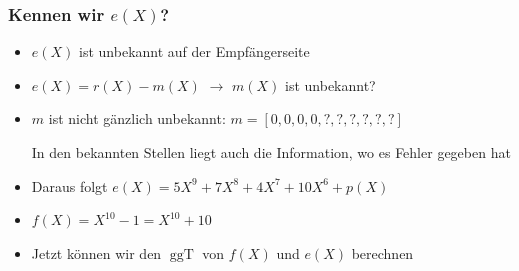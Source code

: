 \documentclass[11pt,aspectratio=169]{beamer}
\begin{document}
	\begin{frame}
		\frametitle{Kennen wir $e(X)$?}
		
		\begin{itemize}
			
			\item $e(X)$ ist unbekannt auf der Empfängerseite
			
			\vspace{10pt}
			
			\item $e(X) = r(X) - m(X)$ \qquad $\rightarrow$ \qquad $m(X)$ ist unbekannt?
			
			\vspace{10pt}
			
			\item $m$ ist nicht gänzlich unbekannt: $m = [0,0,0,0,?,?,?,?,?,?]$
			
			In den bekannten Stellen liegt auch die Information, wo es Fehler gegeben hat
			
			\vspace{10pt}
			
			\item Daraus folgt $e(X) = 5X^9 + 7X^8 + 4X^7 + 10X^6 + p(X)$
			
			\vspace{10pt}
			
			\item $f(X) = X^{10} - 1 = X^{10} + 10$
			
			\vspace{10pt}
			
			\item Jetzt können wir den $\operatorname{ggT}$ von $f(X)$ und $e(X)$ berechnen
		\end{itemize}
		
	\end{frame}
\end{document}
